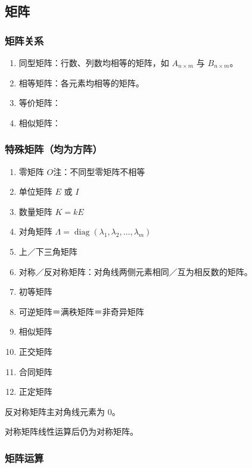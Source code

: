 \documentclass[UTF8,fontset=fandol,zihao=5]{ctexart}
\newcommand{\diag}{\operatorname{diag}}
\begin{document}
\subsection{矩阵}

\subsubsection{矩阵关系}

\begin{enumerate}[label=（\arabic*）]
  \item 同型矩阵：行数、列数均相等的矩阵，如 $A_{n\times m}$ 与 $B_{n\times m}$。
  \item 相等矩阵：各元素均相等的矩阵。
  \item 等价矩阵：
  \item 相似矩阵：
\end{enumerate}

\subsubsection{特殊矩阵（均为方阵）}

\begin{enumerate}[label=（\arabic*）]
  \item 零矩阵 $O$\qquad 注：不同型零矩阵不相等
  \item 单位矩阵 $E$ 或 $I$
  \item 数量矩阵 $K=kE$
  \item 对角矩阵 $\Lambda=\diag(\lambda_1,\lambda_2,\ldots,\lambda_m)$
  \item 上／下三角矩阵
  \item 对称／反对称矩阵：对角线两侧元素相同／互为相反数的矩阵。
  \item 初等矩阵
  \item 可逆矩阵＝满秩矩阵＝非奇异矩阵
  \item 相似矩阵
  \item 正交矩阵
  \item 合同矩阵
  \item 正定矩阵
\end{enumerate}

\begin{method}[【注意】特殊矩阵]
反对称矩阵主对角线元素为 $0$。

对称矩阵线性运算后仍为对称矩阵。
\end{method}

\subsubsection{矩阵运算}
\end{document}
